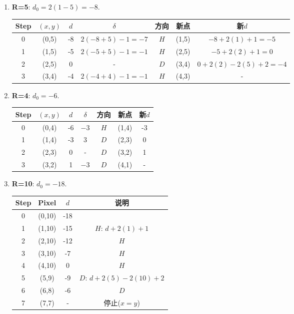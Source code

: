 \documentclass[UTF8]{ctexart}
\begin{document}
\begin{enumerate}
    \item \textbf{R=5}: $d_0=2(1-5)=-8$.
    \begin{center}
    \begin{tabular}{ccccccc}
    \toprule Step & $(x,y)$ & $d$ & $\delta$ & 方向 & 新点 & 新$d$ \\ \midrule
    0 & (0,5) & -8 & $2(-8+5)-1=-7$ & $H$ & (1,5) & $-8+2(1)+1=-5$ \\
    1 & (1,5) & -5 & $2(-5+5)-1=-1$ & $H$ & (2,5) & $-5+2(2)+1=0$ \\
    2 & (2,5) & 0 & - & $D$ & (3,4) & $0+2(2)-2(5)+2=-4$ \\
    3 & (3,4) & -4 & $2(-4+4)-1=-1$ & $H$ & (4,3) & - \\ \bottomrule
    \end{tabular}
    \end{center}
    
    \item \textbf{R=4}: $d_0=-6$.
    \begin{center}
    \begin{tabular}{ccccccc}
    \toprule Step & $(x,y)$ & $d$ & $\delta$ & 方向 & 新点 & 新$d$ \\ \midrule
    0 & (0,4) & -6 & $-3$ & $H$ & (1,4) & -3 \\
    1 & (1,4) & -3 & $3$ & $D$ & (2,3) & 0 \\
    2 & (2,3) & 0 & - & $D$ & (3,2) & 1 \\
    3 & (3,2) & 1 & $-3$ & $D$ & (4,1) & - \\ \bottomrule
    \end{tabular}
    \end{center}
    
    \item \textbf{R=10}: $d_0=-18$.
    \begin{center}
    \begin{tabular}{cccc}
    \toprule Step & Pixel & $d$ & 说明 \\ \midrule
    0 & (0,10) & -18 & \\
    1 & (1,10) & -15 & $H$: $d+2(1)+1$ \\
    2 & (2,10) & -12 & $H$ \\
    3 & (3,10) & -7 & $H$ \\
    4 & (4,10) & 0 & $H$ \\
    5 & (5,9) & -9 & $D$: $d+2(5)-2(10)+2$ \\
    6 & (6,8) & -6 & $D$ \\
    7 & (7,7) & - & 停止($x=y$) \\ \bottomrule
    \end{tabular}
    \end{center}
    

\end{enumerate}
\end{document}
